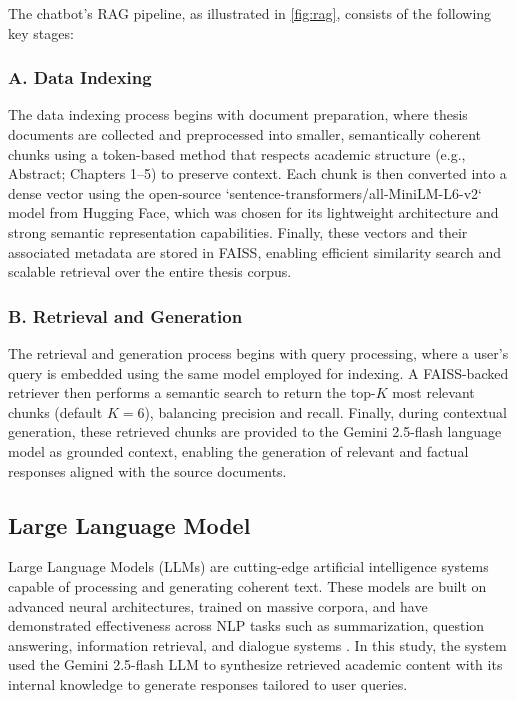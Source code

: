 \begin{refsection}
The chatbot’s RAG pipeline, as illustrated in \ref{fig:rag}, consists of the following key stages:

\subsubsection{A. Data Indexing}

The data indexing process begins with document preparation, where thesis documents are collected and preprocessed into smaller, semantically coherent chunks using a token-based method that respects academic structure (e.g., Abstract; Chapters 1–5) to preserve context. Each chunk is then converted into a dense vector using the open-source `sentence-transformers/all-MiniLM-L6-v2` model from Hugging Face, which was chosen for its lightweight architecture and strong semantic representation capabilities. Finally, these vectors and their associated metadata are stored in FAISS, enabling efficient similarity search and scalable retrieval over the entire thesis corpus.

\subsubsection{B. Retrieval and Generation}

The retrieval and generation process begins with query processing, where a user's query is embedded using the same model employed for indexing. A FAISS-backed retriever then performs a semantic search to return the top-$K$ most relevant chunks (default $K=6$), balancing precision and recall. Finally, during contextual generation, these retrieved chunks are provided to the Gemini 2.5-flash language model as grounded context, enabling the generation of relevant and factual responses aligned with the source documents.

\subsection{Large Language Model}

Large Language Models (LLMs) are cutting-edge artificial intelligence systems capable of processing and generating coherent text. These models are built on advanced neural architectures, trained on massive corpora, and have demonstrated effectiveness across NLP tasks such as summarization, question answering, information retrieval, and dialogue systems \citeauthor{naveed2024} \citeyear{naveed2024}. In this study, the system used the Gemini 2.5-flash LLM to synthesize retrieved academic content with its internal knowledge to generate responses tailored to user queries.


\end{refsection}
